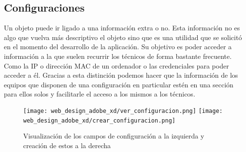 \subsection{Configuraciones}

Un objeto puede ir ligado a una información extra o no. Esta información no es algo que vuelva más descriptivo el objeto sino que es una utilidad que se solicitó en el momento del desarrollo de la aplicación. Su objetivo es poder acceder a información a la que suelen recurrir los técnicos de forma bastante frecuente. Como la IP o dirección MAC de un ordenador o las credenciales para poder acceder a él. Gracias a esta distinción podemos hacer que la información de los equipos que disponen de una configuración en particular estén en una sección para ellos solos y facilitarle el acceso a los mismos a los técnicos.

\begin{figure}[htbp]
    \centering
        \texttt{[image: web\_design\_adobe\_xd/ver\_configuracion.png]}
        \texttt{[image: web\_design\_adobe\_xd/crear\_configuracion.png]}
        \caption{Visualización de los campos de configuración a la izquierda y creación de estos a la derecha}
\end{figure}